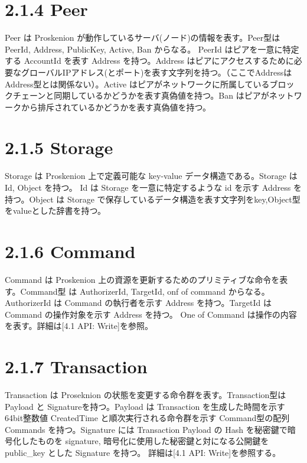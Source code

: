 \hypertarget{peer}{%
\section{2.1.4 Peer}\label{peer}}

Peer は Proskenion が動作しているサーバ(ノード)の情報を表す。Peer型は
PeerId, Address, PublicKey, Active, Ban からなる。 PeerId
はピアを一意に特定する AccountId を表す Address を持つ。Address
はピアにアクセスするために必要なグローバルIPアドレス(とポート)を表す文字列を持つ。（ここでAddressはAddress型とは関係ない）。Active
はピアがネットワークに所属しているブロックチェーンと同期しているかどうかを表す真偽値を持つ。Ban
はピアがネットワークから排斥されているかどうかを表す真偽値を持つ。

\hypertarget{storage}{%
\section{2.1.5 Storage}\label{storage}}

Storage は Proskenion 上で定義可能な key-value データ構造である。Storage
は Id, Object を持つ。 Id は Storage を一意に特定するような id を示す
Address を持つ。Object は Storage
で保存しているデータ構造を表す文字列をkey,Object型をvalueとした辞書を持つ。

\hypertarget{command}{%
\section{2.1.6 Command}\label{command}}

Command は Proskenion
上の資源を更新するためのプリミティブな命令を表す。Command型 は
AuthorizerId, TargetId, onf of command からなる。AuthorizerId は Command
の執行者を示す Address を持つ。TargetId は Command の操作対象を示す
Address を持つ。 One of Command は操作の内容を表す。詳細は{[}4.1 API:
Write{]}を参照。

\hypertarget{transaction}{%
\section{2.1.7 Transaction}\label{transaction}}

Transaction は Proseknion の状態を変更する命令群を表す。Transaction型は
Payload と Signatureを持つ。Payload は Transaction
を生成した時間を示す64bit整数値 CreatedTime と順次実行される命令群を示す
Command型の配列 Commands を持つ。Signature には Transaction Payload の
Hash を秘密鍵で暗号化したものを signature,
暗号化に使用した秘密鍵と対になる公開鍵を public\_key とした Signature
を持つ。 詳細は{[}4.1 API: Write{]}を参照する。

